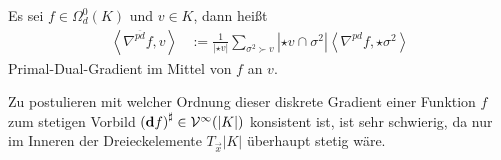   \begin{definition}
    Es sei \( f\in\Omega^{0}_{d}(K) \) und \( v\in K \), dann heißt
    \begin{align}
      \left\langle \nabla^{\overline{pd}} f, v \right\rangle
          &:= \frac{1}{\left| \star v \right|} \sum_{\sigma^{2}\succ v} \left| \star v \cap \sigma^{2} \right| 
                  \left\langle \nabla^{pd} f , \star\sigma^{2} \right\rangle
    \end{align}
    Primal-Dual-Gradient im Mittel von \( f \) an \( v \).
  \end{definition}
  Zu postulieren mit welcher Ordnung dieser diskrete Gradient einer Funktion \( f \) zum stetigen Vorbild 
  \( \left( \mathbf{d} f \right)^{\sharp}\in \mathcal{V}^{\infty}(|K|) \) konsistent ist, ist sehr schwierig, da nur im Inneren der Dreieckelemente 
  \( T_{\vec{x}}|K| \) überhaupt stetig wäre.
  

